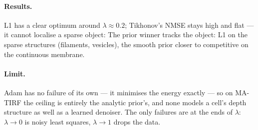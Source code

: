 \paragraph{Results.}
L1 has a clear optimum around $\lambda\approx0.2$; Tikhonov's NMSE stays high and flat --- it
cannot localise a sparse object:
\noindent The prior winner tracks the object: L1 on the sparse structures (filaments, vesicles),
the smooth prior closer to competitive on the continuous membrane.

\paragraph{Limit.}
Adam has no failure of its own --- it minimises the energy exactly --- so on MA-TIRF the ceiling
is entirely the analytic prior's, and none models a cell's depth structure as well as a learned
denoiser. The only failures are at the ends of $\lambda$: $\lambda\to0$ is noisy least squares,
$\lambda\to1$ drops the data.
